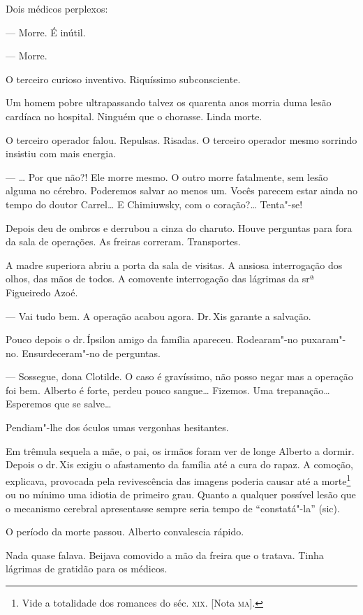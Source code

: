 \begin{linenumbers}
Dois médicos perplexos:

--- Morre. É inútil.

--- Morre.

O terceiro curioso inventivo. Riquíssimo subconsciente.

Um homem pobre ultrapassando talvez os quarenta anos morria duma lesão
cardíaca no hospital. Ninguém que o chorasse. Linda morte.

O terceiro operador falou. Repulsas. Risadas. O terceiro operador mesmo
sorrindo insistiu com mais energia.

--- \ldots{} Por que não?! Ele morre mesmo. O outro morre fatalmente, sem
lesão alguma no cérebro. Poderemos salvar ao menos um. Vocês parecem
estar ainda no tempo do doutor Carrel\ldots{} E Chimiuwsky, com o coração?\ldots{}
Tenta"-se!

Depois deu de ombros e derrubou a cinza do charuto. Houve perguntas para
fora da sala de operações. As freiras correram. Transportes.

A madre superiora abriu a porta da sala de visitas. A ansiosa
interrogação dos olhos, das mãos de todos. A comovente interrogação das
lágrimas da srª Figueiredo Azoé.

--- Vai tudo bem. A operação acabou agora. Dr.\,Xis garante a salvação.

Pouco depois o dr.\,Ípsilon amigo da família apareceu. Rodearam"-no
puxaram"-no. Ensurdeceram"-no de perguntas.

--- Sossegue, dona Clotilde. O caso é gravíssimo, não posso negar mas a
operação foi bem. Alberto é forte, perdeu pouco sangue\ldots{} Fizemos. Uma
trepanação\ldots{} Esperemos que se salve\ldots{}

Pendiam"-lhe dos óculos umas vergonhas hesitantes.

Em trêmula sequela a mãe, o pai, os irmãos foram ver de longe Alberto a
dormir. Depois o dr.\,Xis exigiu o afastamento da família até a cura do
rapaz. A comoção, explicava, provocada pela revivescência das imagens
poderia causar até a morte\footnote{Vide a totalidade dos romances do
  séc. \textsc{xix}. {[}Nota \textsc{ma}{]}.} ou no mínimo uma idiotia de primeiro grau.
Quanto a qualquer possível lesão que o mecanismo cerebral apresentasse
sempre seria tempo de ``constatá"-la'' (sic).

O período da morte passou. Alberto convalescia rápido.

Nada quase falava. Beijava comovido a mão da freira que o tratava. Tinha
lágrimas de gratidão para os médicos.


\end{linenumbers}
